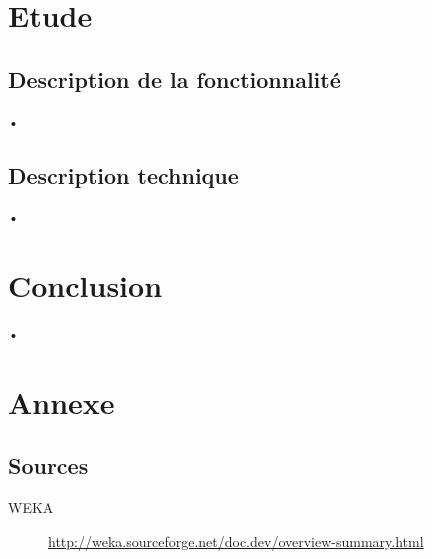 \documentclass[10pt,a4paper]{report}
\begin{document}

\section{Etude}

\subsection{Description de la fonctionnalité}
\begin{flushleft}
•
\end{flushleft}

\subsection{Description technique}
\begin{flushleft}
•
\end{flushleft}



\section{Conclusion}
\begin{flushleft}
•
\end{flushleft}



\section{Annexe}
\subsection*{Sources}
\begin{description}
	\item[WEKA] \url{http://weka.sourceforge.net/doc.dev/overview-summary.html}
\end{description}
\newpage
\end{document}
